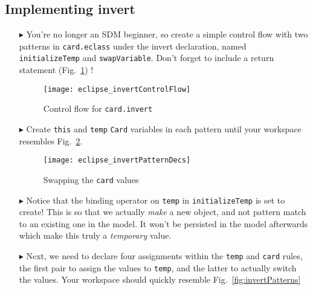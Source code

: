 \newpage
\hypertarget{invertCard tex}{}
\subsection{Implementing invert}
\texHeader

\begin{itemize}

\item[$\blacktriangleright$] You're no longer an SDM beginner, so create a simple control flow with two patterns in \texttt{card.eclass} under the invert
declaration, named \texttt{initializeTemp} and \texttt{swapVariable}. Don't forget to include a return statement (Fig.~\ref{fig:eclipse_invert}) !

\begin{figure}[htbp]
\begin{center}
  \texttt{[image: eclipse\_invertControlFlow]}
  \caption{Control flow for \texttt{card.invert}}  
  \label{fig:eclipse_invert}
\end{center}
\end{figure}

\item[$\blacktriangleright$] Create \texttt{this} and \texttt{temp} \texttt{Card} variables in each pattern until your workspace resembles
Fig.~\ref{fig:invertPatternsDecs}.

\begin{figure}[htbp]
\begin{center}
  \texttt{[image: eclipse\_invertPatternDecs]}
  \caption{Swapping the \texttt{card} values}  
  \label{fig:invertPatternsDecs}
\end{center}
\end{figure}

\item[$\blacktriangleright$] Notice that the binding operator on \texttt{temp} in \texttt{initializeTemp} is set to create! This is so that we actually
\emph{make} a new object, and not pattern match to an existing one in the model. It won't be persisted in the model afterwards which make this truly a
\emph{temporary} value.

\item[$\blacktriangleright$] Next, we need to declare four assignments within the \texttt{temp} and \texttt{card} rules, the first pair to assign the values to
\texttt{temp}, and the latter to actually switch the values. Your workspace should quickly resemble Fig.~\ref{fig:invertPatterns}


\end{itemize}
